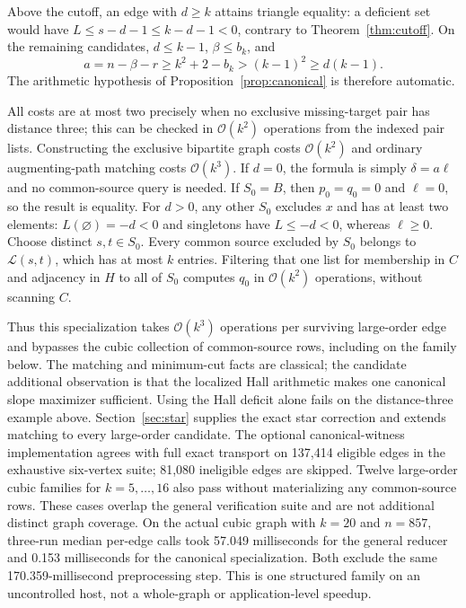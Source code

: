 \documentclass[11pt]{article}
\theoremstyle{remark}
\newcommand{\Oh}{\mathcal O}
\begin{document}
Above the cutoff, an edge with $d\ge k$ attains triangle equality: a deficient set would have $L\le s-d-1\le k-d-1<0$, contrary to Theorem~\ref{thm:cutoff}. On the remaining candidates, $d\le k-1$, $\beta\le b_k$, and
\[
 a=n-\beta-r\ge k^2+2-b_k>(k-1)^2\ge d(k-1).
\]
The arithmetic hypothesis of Proposition~\ref{prop:canonical} is therefore automatic.

All costs are at most two precisely when no exclusive missing-target pair has distance three; this can be checked in $\Oh(k^2)$ operations from the indexed pair lists. Constructing the exclusive bipartite graph costs $\Oh(k^2)$ and ordinary augmenting-path matching costs $\Oh(k^3)$. If $d=0$, the formula is simply $\delta=a\ell$ and no common-source query is needed. If $S_0=B$, then $p_0=q_0=0$ and $\ell=0$, so the result is equality. For $d>0$, any other $S_0$ excludes $x$ and has at least two elements: $L(\varnothing)=-d<0$ and singletons have $L\le-d<0$, whereas $\ell\ge0$. Choose distinct $s,t\in S_0$. Every common source excluded by $S_0$ belongs to $\mathcal L(s,t)$, which has at most $k$ entries. Filtering that one list for membership in $C$ and adjacency in $H$ to all of $S_0$ computes $q_0$ in $\Oh(k^2)$ operations, without scanning $C$.

Thus this specialization takes $\Oh(k^3)$ operations per surviving large-order edge and bypasses the cubic collection of common-source rows, including on the family below. The matching and minimum-cut facts are classical; the candidate additional observation is that the localized Hall arithmetic makes one canonical slope maximizer sufficient. Using the Hall deficit alone fails on the distance-three example above. Section~\ref{sec:star} supplies the exact star correction and extends matching to every large-order candidate.
The optional canonical-witness implementation agrees with full exact transport on 137,414 eligible edges in the exhaustive six-vertex suite; 81,080 ineligible edges are skipped. Twelve large-order cubic families for $k=5,\ldots,16$ also pass without materializing any common-source rows. These cases overlap the general verification suite and are not additional distinct graph coverage. On the actual cubic graph with $k=20$ and $n=857$, three-run median per-edge calls took 57.049 milliseconds for the general reducer and 0.153 milliseconds for the canonical specialization. Both exclude the same 170.359-millisecond preprocessing step. This is one structured family on an uncontrolled host, not a whole-graph or application-level speedup.
\end{document}
